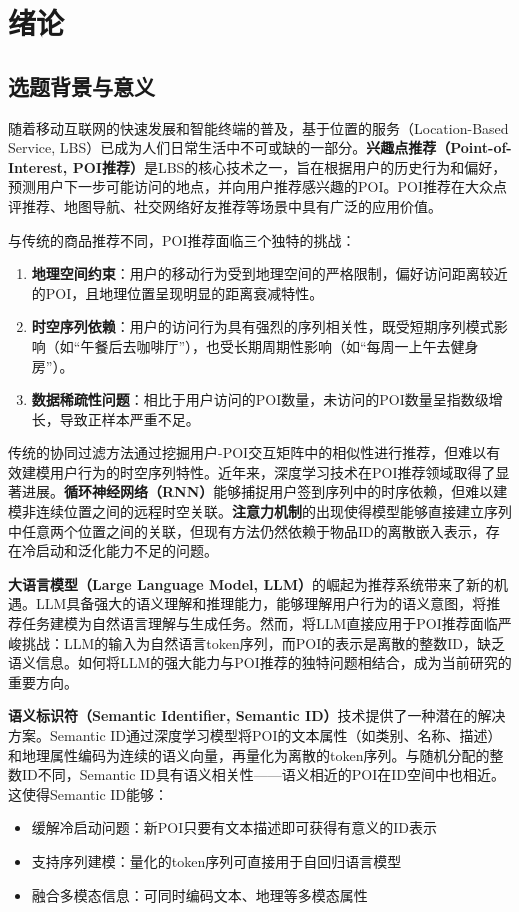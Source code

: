 \chapter{绪论}
\label{chap:intro}

\section{选题背景与意义}
\label{sec:background}

随着移动互联网的快速发展和智能终端的普及，基于位置的服务（Location-Based Service, LBS）已成为人们日常生活中不可或缺的一部分。\textbf{兴趣点推荐（Point-of-Interest, POI推荐）}是LBS的核心技术之一，旨在根据用户的历史行为和偏好，预测用户下一步可能访问的地点，并向用户推荐感兴趣的POI。POI推荐在大众点评推荐、地图导航、社交网络好友推荐等场景中具有广泛的应用价值。

与传统的商品推荐不同，POI推荐面临三个独特的挑战：

\begin{enumerate}
    \item \textbf{地理空间约束}：用户的移动行为受到地理空间的严格限制，偏好访问距离较近的POI，且地理位置呈现明显的距离衰减特性。
    \item \textbf{时空序列依赖}：用户的访问行为具有强烈的序列相关性，既受短期序列模式影响（如``午餐后去咖啡厅''），也受长期周期性影响（如``每周一上午去健身房''）。
    \item \textbf{数据稀疏性问题}：相比于用户访问的POI数量，未访问的POI数量呈指数级增长，导致正样本严重不足。
\end{enumerate}

传统的协同过滤方法通过挖掘用户-POI交互矩阵中的相似性进行推荐，但难以有效建模用户行为的时空序列特性。近年来，深度学习技术在POI推荐领域取得了显著进展。\textbf{循环神经网络（RNN）}能够捕捉用户签到序列中的时序依赖，但难以建模非连续位置之间的远程时空关联。\textbf{注意力机制}的出现使得模型能够直接建立序列中任意两个位置之间的关联，但现有方法仍然依赖于物品ID的离散嵌入表示，存在冷启动和泛化能力不足的问题。

\textbf{大语言模型（Large Language Model, LLM）}的崛起为推荐系统带来了新的机遇。LLM具备强大的语义理解和推理能力，能够理解用户行为的语义意图，将推荐任务建模为自然语言理解与生成任务。然而，将LLM直接应用于POI推荐面临严峻挑战：LLM的输入为自然语言token序列，而POI的表示是离散的整数ID，缺乏语义信息。如何将LLM的强大能力与POI推荐的独特问题相结合，成为当前研究的重要方向。

\textbf{语义标识符（Semantic Identifier, Semantic ID）}技术提供了一种潜在的解决方案。Semantic ID通过深度学习模型将POI的文本属性（如类别、名称、描述）和地理属性编码为连续的语义向量，再量化为离散的token序列。与随机分配的整数ID不同，Semantic ID具有语义相关性——语义相近的POI在ID空间中也相近。这使得Semantic ID能够：
\begin{itemize}
    \item 缓解冷启动问题：新POI只要有文本描述即可获得有意义的ID表示
    \item 支持序列建模：量化的token序列可直接用于自回归语言模型
    \item 融合多模态信息：可同时编码文本、地理等多模态属性
\end{itemize}

